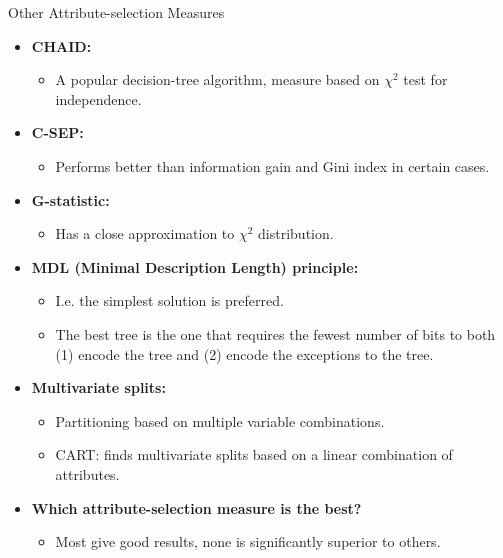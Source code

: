 \begin{frame}{Other Attribute-selection Measures}
  \begin{itemize}
  \item \textbf{CHAID:}
    \begin{itemize}
    \item A popular decision-tree algorithm, measure based on $\chi^2$ test for independence.
    \end{itemize}
  \item \textbf{C-SEP:}
    \begin{itemize}
    \item Performs better than information gain and Gini index in certain cases.
    \end{itemize}
  \item \textbf{G-statistic:}
    \begin{itemize}
    \item Has a close approximation to $\chi^2$ distribution.
    \end{itemize}
  \item \textbf{MDL (Minimal Description Length) principle:}
    \begin{itemize}
    \item I.e. the simplest solution is preferred.
    \item The best tree is the one that requires the fewest number of bits to both (1) encode the tree and (2) encode the exceptions to the tree.
    \end{itemize}
  \item \textbf{Multivariate splits:}
    \begin{itemize}
    \item Partitioning based on multiple variable combinations.
    \item CART: finds multivariate splits based on a linear combination of attributes.
    \end{itemize}
  \item \textbf{Which attribute-selection measure is the best?}
    \begin{itemize}
    \item Most give good results, none is significantly superior to others.
    \end{itemize}
  \end{itemize}
\end{frame}

